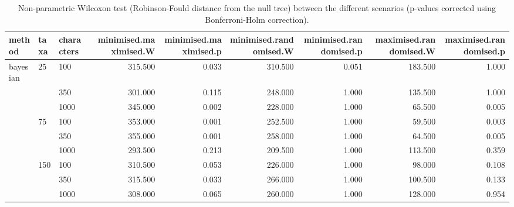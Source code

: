 \begin{table}[ht]
\centering
\begin{tabular}{lllrrrrrr}
  \hline
method & taxa & characters & minimised.maximised.W & minimised.maximised.p & minimised.randomised.W & minimised.randomised.p & maximised.randomised.W & maximised.randomised.p \\ 
  \hline
bayesian & 25 & 100 & 315.500 & 0.033 & 310.500 & 0.051 & 183.500 & 1.000 \\ 
   &  & 350 & 301.000 & 0.115 & 248.000 & 1.000 & 135.500 & 1.000 \\ 
   &  & 1000 & 345.000 & 0.002 & 228.000 & 1.000 & 65.500 & 0.005 \\ 
   & 75 & 100 & 353.000 & 0.001 & 252.500 & 1.000 & 59.500 & 0.003 \\ 
   &  & 350 & 355.000 & 0.001 & 258.000 & 1.000 & 64.500 & 0.005 \\ 
   &  & 1000 & 293.500 & 0.213 & 209.500 & 1.000 & 113.500 & 0.359 \\ 
   & 150 & 100 & 310.500 & 0.053 & 226.000 & 1.000 & 98.000 & 0.108 \\ 
   &  & 350 & 315.500 & 0.033 & 266.000 & 1.000 & 100.500 & 0.133 \\ 
   &  & 1000 & 308.000 & 0.065 & 260.000 & 1.000 & 128.000 & 0.954 \\ 
   \hline
\end{tabular}
\caption{Non-parametric Wilcoxon test (Robinson-Fould distance from the null tree) between the different scenarios (p-values corrected using Bonferroni-Holm correction).} 
\label{Full_Tab_Bayesian_WXRFnull}
\end{table}

